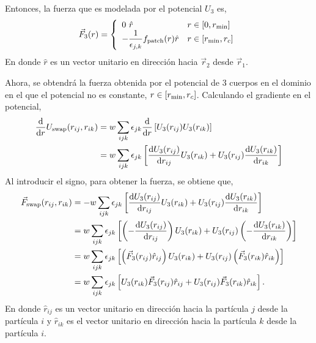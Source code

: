 \documentclass[../main.tex]{subfiles}
\begin{document}
Entonces, la fuerza que es modelada por el potencial \(U_3\) es,
\begin{gather*}
    \vec{F}_{3}(r) =
    \left\{
    \begin{array}{ll}
        0~\hat{r} & r\in\qty[0,r_{\min}] \\
        -\dfrac{1}{\epsilon_{j,k}}f_{\mathrm{patch}}(r)\hat{r} & r\in\qty[r_{\min},r_c]
    \end{array}
    \right.
\end{gather*}
En donde \(\hat{r}\) es un vector unitario en dirección hacia \(\vec{r}_2\) desde \(\vec{r}_1\).

Ahora, se obtendrá la fuerza obtenida por el potencial de 3 cuerpos en el dominio en el que el potencial no es constante, \(r\in\qty[r_{\min},r_c]\).
Calculando el gradiente en el potencial,
\begin{align*}
    \dv{r}U_{\mathrm{swap}}\qty(r_{ij},r_{ik}) &= w\sum_{ijk}\epsilon_{jk}\dv{r}\left[U_3(r_{ij})U_3(r_{ik})\right] \\
                                               &= w\sum_{ijk}\epsilon_{jk}\left[\dv{U_3(r_{ij})}{r_{ij}}U_3(r_{ik}) + U_3(r_{ij})\dv{U_3(r_{ik})}{r_{ik}}\right]
\end{align*}
Al introducir el signo, para obtener la fuerza, se obtiene que,
\begin{align*}
    \vec{F}_{\mathrm{swap}}\qty(r_{ij},r_{ik}) &= -w\sum_{ijk}\epsilon_{jk}\left[\dv{U_3(r_{ij})}{r_{ij}}U_3(r_{ik}) + U_3(r_{ij})\dv{U_3(r_{ik})}{r_{ik}}\right] \\
                                               &= w\sum_{ijk}\epsilon_{jk}\left[\left(-\dv{U_3(r_{ij})}{r_{ij}}\right)U_3(r_{ik}) + U_3(r_{ij})\left(-\dv{U_3(r_{ik})}{r_{ik}}\right)\right] \\
                                               &= w\sum_{ijk}\epsilon_{jk}\left[\left(\vec{F}_3\qty(r_{ij})\hat{r}_{ij}\right)U_3(r_{ik}) + U_3(r_{ij})\left(\vec{F}_3\qty(r_{ik})\hat{r}_{ik}\right)\right] \\
                                               &= w\sum_{ijk}\epsilon_{jk}\left[U_3(r_{ik})\vec{F}_3\qty(r_{ij})\hat{r}_{ij} + U_3(r_{ij})\vec{F}_3\qty(r_{ik})\hat{r}_{ik}\right].
\end{align*}
En donde \(\hat{r}_{ij}\) es un vector unitario en dirección hacia la partícula $j$ desde la partícula $i$ y \(\hat{r}_{ik}\) es el vector unitario en dirección hacia la partícula $k$ desde la partícula $i$.

\end{document}
